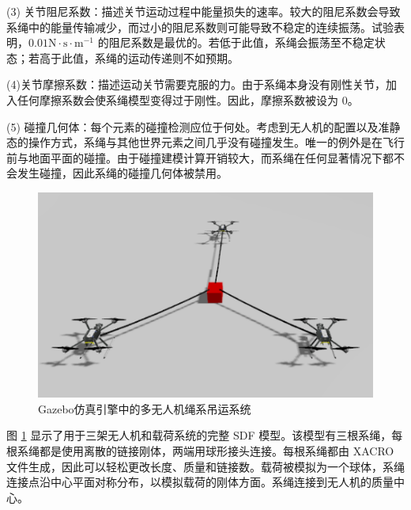 \documentclass[lang=chs, degree=master, blindreview=true, winfonts=true]{yanputhesis}
\begin{document}
(3) {关节阻尼系数}：描述关节运动过程中能量损失的速率。较大的阻尼系数会导致系绳中的能量传输减少，而过小的阻尼系数则可能导致不稳定的连续振荡。试验表明，$0.01  \text {N}\cdot \text{s} \cdot \text{m}^{-1}$ 
的阻尼系数是最优的。若低于此值，系绳会振荡至不稳定状态；若高于此值，系绳的运动传递则不如预期。
    
(4){关节摩擦系数}：描述运动关节需要克服的力。由于系绳本身没有刚性关节，加入任何摩擦系数会使系绳模型变得过于刚性。因此，摩擦系数被设为 0。
    
(5) {碰撞几何体}：每个元素的碰撞检测应位于何处。考虑到无人机的配置以及准静态的操作方式，系绳与其他世界元素之间几乎没有碰撞发生。唯一的例外是在飞行前与地面平面的碰撞。由于碰撞建模计算开销较大，而系绳在任何显著情况下都不会发生碰撞，因此系绳的碰撞几何体被禁用。



\begin{figure}[hbt!]
	\centering
	\includegraphics[width=36pc]{picture/5_2.png} 
	\caption{Gazebo仿真引擎中的多无人机绳系吊运系统} 
	\label{5_2}
\end{figure}

图 \ref{5_2} 显示了用于三架无人机和载荷系统的完整 SDF 模型。该模型有三根系绳，每根系绳都是使用离散的链接刚体，两端用球形接头连接。每根系绳都由 XACRO 文件生成，因此可以轻松更改长度、质量和链接数。载荷被模拟为一个球体，系绳连接点沿中心平面对称分布，以模拟载荷的刚体方面。系绳连接到无人机的质量中心。
\end{document}
